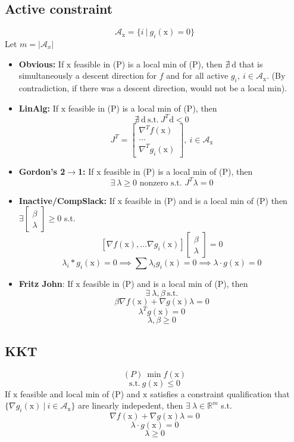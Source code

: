 \documentclass[6pt]{article}
\def\x{\textrm{x}}
\def\d{\textrm{d}}
\def\suchthat{\textrm{s.t.} }
\begin{document}
\subsection{Active constraint}
$$\mathcal{A}_\x = \{i~|~g_i(\x) = 0\}$$
Let $m=|\mathcal{A}_x|$
\begin{itemize}
    \item \textbf{Obvious:} If $\x$ feasible in (P) is a local min of (P), then $\nexists~ \d$ that is simultaneously a descent direction for $f$ and for all active $g_i,~ i\in \mathcal{A}_\x$. (By contradiction, if there was a descent direction, would not be a local min).
    \item \textbf{LinAlg:} If $\x$ feasible in (P) is a local min of (P), then $$\nexists~ \d ~\suchthat~J^T\d<0$$
    $$J^T = \begin{bmatrix}\nabla^Tf(\x)\\
    \ldots\\
    \nabla^T g_i(\x)\end{bmatrix}, ~i \in \mathcal{A}_\x$$
    \item \textbf{Gordon's 2$\to$1:} If $\x$ feasible in (P) is a local min of (P), then $$\exists~ \lambda \geq 0 \textrm{ nonzero s.t. } J^T\lambda = 0$$
    \item \textbf{Inactive/CompSlack:} If $\x$ feasible in (P) and is a local min of (P) then $\exists \begin{bmatrix}\beta\\\lambda\end{bmatrix}\geq 0$ s.t. 
    $$[\nabla f(\x), \ldots \nabla g_i(\x)] \begin{bmatrix}\beta\\\lambda\end{bmatrix} = 0$$
    $$\lambda_i * g_i(\x) = 0\implies \sum \lambda_i g_i(\x)=0\implies \lambda \cdot g(\x) = 0$$
    \item \textbf{Fritz John}: If $\x$ feasible in (P) and is a local min of (P), then $$\exists~\lambda, \beta ~\suchthat{}$$
    $$\beta\nabla f(\x) + \nabla g(\x)\lambda = 0$$
    $$\lambda^T g(\x) = 0$$
    $$\lambda, \beta \geq 0$$
\end{itemize}{}
\subsection{KKT}
$$(P)~\min f(\x)$$
$$\suchthat{}~g(\x) \leq 0$$
If $\x$ feasible and local min of (P) and $\x$ satisfies a constraint qualification that $\{\nabla g_i(\x)~|~i\in\mathcal{A}_\x\}$ are linearly indepedent, then $\exists~ \lambda \in\mathbb{R}^m$ s.t.
$$\nabla f(\x) + \nabla g(\x)\lambda = 0$$
$$\lambda \cdot g(\x) = 0$$
$$\lambda \geq 0$$
\end{document}
